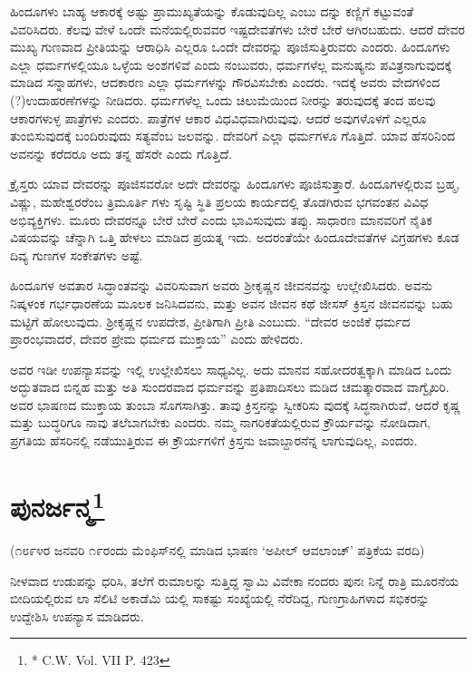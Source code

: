 ಹಿಂದೂಗಳು ಬಾಹ್ಯ ಆಕಾರಕ್ಕೆ ಅಷ್ಟು ಪ್ರಾಮುಖ್ಯತೆಯನ್ನು ಕೊಡುವುದಿಲ್ಲ ಎಂಬು ದನ್ನು ಕಣ್ಣಿಗೆ ಕಟ್ಟುವಂತೆ ವಿವರಿಸಿದರು. ಕೆಲವು ವೇಳೆ ಒಂದೇ ಮನೆಯಲ್ಲಿರುವವರ ಇಷ್ಟದೇವತೆಗಳು ಬೇರೆ ಬೇರೆ ಆಗಿರಬಹುದು. ಆದರೆ ದೇವರ ಮುಖ್ಯ ಗುಣವಾದ ಪ್ರೀತಿಯನ್ನು ಆರಾಧಿಸಿ ಎಲ್ಲರೂ ಒಂದೇ ದೇವರನ್ನು ಪೂಜಿಸುತ್ತಿರುವರು ಎಂದರು. ಹಿಂದೂಗಳು ಎಲ್ಲಾ ಧರ್ಮಗಳಲ್ಲಿಯೂ ಒಳ್ಳೆಯ ಅಂಶಗಳಿವೆ ಎಂದು ನಂಬುವರು, ಧರ್ಮಗಳೆಲ್ಲ ಮನುಷ್ಯನು ಪವಿತ್ರನಾಗುವುದಕ್ಕೆ ಮಾಡಿದ ಸನ್ನಾಹಗಳು, ಆದಕಾರಣ ಎಲ್ಲಾ ಧರ್ಮಗಳನ್ನು ಗೌರವಿಸಬೇಕು ಎಂದರು. ಇದಕ್ಕೆ ಅವರು ವೇದಗಳಿಂದ (?)ಉದಾಹರಣೆಗಳನ್ನು ನೀಡಿದರು. ಧರ್ಮಗಳೆಲ್ಲ ಒಂದು ಚಿಲುಮೆಯಿಂದ ನೀರನ್ನು ತರುವುದಕ್ಕೆ ತಂದ ಹಲವು ಆಕಾರಗಳುಳ್ಳ ಪಾತ್ರೆಗಳು ಎಂದರು. ಪಾತ್ರೆಗಳ ಆಕಾರ ವಿಧವಿಧವಾಗಿರುವುವು. ಆದರೆ ಅವುಗಳೊಳಗೆ ಎಲ್ಲರೂ ತುಂಬಿಸುವುದಕ್ಕೆ ಬಂದಿರುವುದು ಸತ್ಯವೆಂಬ ಜಲವನ್ನು. ದೇವರಿಗೆ ಎಲ್ಲಾ ಧರ್ಮಗಳೂ ಗೊತ್ತಿದೆ. ಯಾವ ಹೆಸರಿನಿಂದ ಅವನನ್ನು ಕರೆದರೂ ಅದು ತನ್ನ ಹೆಸರೇ ಎಂದು ಗೊತ್ತಿದೆ.

ಕ್ರೈಸ್ತರು ಯಾವ ದೇವರನ್ನು ಪೂಜಿಸವರೋ ಅದೇ ದೇವರನ್ನು ಹಿಂದೂಗಳು ಪೂಜಿಸುತ್ತಾರೆ. ಹಿಂದೂಗಳಲ್ಲಿರುವ ಬ್ರಹ್ಮ, ವಿಷ್ಣು, ಮಹೇಶ್ವರರೆಂಬ ತ್ರಿಮೂರ್ತಿ ಗಳು ಸೃಷ್ಟಿ ಸ್ಥಿತಿ ಪ್ರಲಯ ಕಾರ್ಯದಲ್ಲಿ ತೊಡಗಿರುವ ಭಗವಂತನ ವಿವಿಧ ಅಭಿವ್ಯಕ್ತಿಗಳು. ಮೂರು ದೇವರನ್ನೂ ಬೇರೆ ಬೇರೆ ಎಂದು ಭಾವಿಸುವುದು ತಪ್ಪು. ಸಾಧಾರಣ ಮಾನವರಿಗೆ ನೈತಿಕ ವಿಷಯವನ್ನು ಚೆನ್ನಾಗಿ ಒತ್ತಿ ಹೇಳಲು ಮಾಡಿದ ಪ್ರಯತ್ನ ಇದು. ಅದರಂತೆಯೇ ಹಿಂದೂದೇವತೆಗಳ ವಿಗ್ರಹಗಳು ಕೂಡ ದಿವ್ಯ ಗುಣಗಳ ಸಂಕೇತಗಳು ಅಷ್ಟೆ.

ಹಿಂದೂಗಳ ಅವತಾರ ಸಿದ್ಧಾಂತವನ್ನು ವಿವರಿಸುವಾಗ ಅವರು ಶ‍್ರೀಕೃಷ್ಣನ ಜೀವನವನ್ನು ಉಲ್ಲೇಖಿಸಿದರು. ಅವನು ನಿಷ್ಕಳಂಕ ಗರ್ಭಧಾರಣೆಯ ಮೂಲಕ ಜನಿಸಿದವನು, ಮತ್ತು ಅವನ ಜೀವನ ಕಥೆ ಜೀಸಸ್​ ಕ್ರಿಸ್ತನ ಜೀವನವನ್ನು ಬಹು ಮಟ್ಟಿಗೆ ಹೋಲುವುದು. ಶ‍್ರೀಕೃಷ್ಣನ ಉಪದೇಶ, ಪ್ರೀತಿಗಾಗಿ ಪ್ರೀತಿ ಎಂಬುದು. “ದೇವರ ಅಂಜಿಕೆ ಧರ್ಮದ ಪ್ರಾರಂಭವಾದರೆ, ದೇವರ ಪ್ರೇಮ ಧರ್ಮದ ಮುಕ್ತಾಯ” ಎಂದು ಹೇಳಿದರು.

ಅವರ ಇಡೀ ಉಪನ್ಯಾಸವನ್ನು ಇಲ್ಲಿ ಉಲ್ಲೇಖಿಸಲು ಸಾಧ್ಯವಿಲ್ಲ. ಅದು ಮಾನವ ಸಹೋದರತ್ವಕ್ಕಾಗಿ ಮಾಡಿದ ಒಂದು ಅದ್ಭುತವಾದ ಬಿನ್ನಹ ಮತ್ತು ಅತಿ ಸುಂದರವಾದ ಧರ್ಮವನ್ನು ಪ್ರತಿಪಾದಿಸಲು ಮಡಿದ ಚಮತ್ಕಾರವಾದ ವಾಗ್ವೈಖರಿ. ಅವರ ಭಾಷಣದ ಮುಕ್ತಾಯ ತುಂಬಾ ಸೊಗಸಾಗಿತ್ತು. ತಾವು ಕ್ರಿಸ್ತನನ್ನು ಸ್ವೀಕರಿಸು ವುದಕ್ಕೆ ಸಿದ್ಧನಾಗಿರುವೆ, ಆದರೆ ಕೃಷ್ಣ ಮತ್ತು ಬುದ್ಧರಿಗೂ ನಾವು ತಲೆಬಾಗಬೇಕು ಎಂದರು. ನಮ್ಮ ನಾಗರಿಕತೆಯಲ್ಲಿರುವ ಕ್ರೌರ್ಯವನ್ನು ನೋಡಿದಾಗ, ಪ್ರಗತಿಯ ಹೆಸರಿನಲ್ಲಿ ನಡೆಯುತ್ತಿರುವ ಈ ಕ್ರೌರ್ಯಗಳಿಗೆ ಕ್ರಿಸ್ತನು ಜವಾಬ್ದಾರನೆನ್ನ ಲಾಗುವುದಿಲ್ಲ, ಎಂದರು.


\section{ಪುನರ್ಜನ್ಮ\protect\footnote{* C.W. Vol. VII P. 423}}

\begin{center}
(೧೮೯೪ರ ಜನವರಿ ೧೯ರಂದು ಮೆಂಫಿಸ್​ನಲ್ಲಿ ಮಾಡಿದ ಭಾಷಣ ‘ಅಪೀಲ್​ ಆವಲಾಂಚ್​’ ಪತ್ರಿಕೆಯ ವರದಿ)
\end{center}

ನೀಳವಾದ ಉಡುಪನ್ನು ಧರಿಸಿ, ತಲೆಗೆ ರುಮಾಲನ್ನು ಸುತ್ತಿದ್ದ ಸ್ವಾಮಿ ವಿವೇಕಾ ನಂದರು ಪುನಃ ನಿನ್ನೆ ರಾತ್ರಿ ಮೂರನೆಯ ಬೀದಿಯಲ್ಲಿರುವ ಲಾ ಸೆಲಿಟಿ ಅಕಾಡೆಮಿ ಯಲ್ಲಿ ಸಾಕಷ್ಟು ಸಂಖ್ಯೆಯಲ್ಲಿ ನೆರೆದಿದ್ದ, ಗುಣಗ್ರಾಹಿಗಳಾದ ಸಭಿಕರನ್ನು ಉದ್ದೇಶಿಸಿ ಉಪನ್ಯಾಸ ಮಾಡಿದರು.

